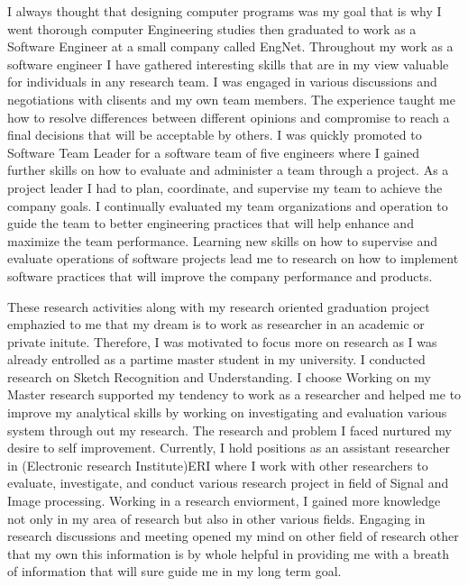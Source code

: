\documentclass[a4paper,12pt]{article}%
\begin{document}
I always thought that designing computer programs was my goal that is why I went thorough computer Engineering studies then graduated to work as a Software Engineer at a small company called EngNet. Throughout my work as a software engineer I have gathered interesting skills that are in my view valuable for individuals in any research team.  I was engaged in various discussions and negotiations with clisents and my own team members. The experience taught me how to resolve differences between different opinions and compromise to reach a final decisions that will be acceptable by others. I was quickly promoted to Software Team Leader for a software team of five engineers  where I gained further skills on how to  evaluate and administer a team through a project. As a project leader I had to plan, coordinate, and  supervise my team to achieve the company goals. I continually evaluated my team organizations and operation to guide the team to better engineering practices that will help enhance and maximize the team performance.  Learning new skills on how to supervise and evaluate operations of software projects lead me to research on how to implement software practices that will improve the company performance and products.  
 
 These research activities along with my research oriented graduation project emphazied to me that my dream is to work as researcher in an academic or private initute. Therefore, I was motivated to focus more on research as I was already entrolled as a partime master student in my  university. I conducted research on Sketch Recognition and Understanding. I choose  Working on my Master research supported my tendency to work as a researcher and helped me to improve my analytical skills by working on investigating and evaluation various system through out my research. The research and problem  I faced nurtured my desire to self improvement. Currently, I hold positions as an assistant researcher in (Electronic research Institute)ERI where I work with other researchers to evaluate, investigate, and conduct  various research project in field of Signal and Image processing. Working in a research enviorment, I gained more knowledge not only in my area of research but also in other various fields. Engaging in research discussions and meeting opened my mind  on other field of research other that my own this information is by whole helpful in providing me with a breath of information that will sure guide me in my long term goal.  
 
\end{document}
